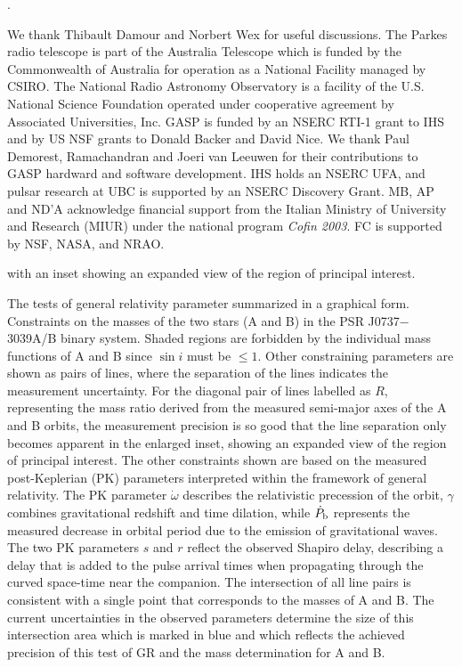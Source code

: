 \documentclass[12pt,psfig]{article}
\newcounter{lastnote}
\newenvironment{scilastnote}{%
\setcounter{lastnote}{\value{enumiv}}%
\addtocounter{lastnote}{+1}%
\begin{list}%
{\arabic{lastnote}.}
{\setlength{\leftmargin}{.22in}}
{\setlength{\labelsep}{.5em}}}
{\end{list}}
\begin{document}

\begin{scilastnote}
\item We thank Thibault Damour and Norbert Wex for useful
discussions. The Parkes radio telescope is part of the Australia
Telescope which is funded by the Commonwealth of Australia for
operation as a National Facility managed by CSIRO.  The National Radio
Astronomy Observatory is a facility of the U.S. National Science
Foundation operated under cooperative agreement by Associated
Universities, Inc.  GASP is funded by an NSERC RTI-1 grant to IHS and
by US NSF grants to Donald Backer and David Nice. 
We thank Paul Demorest, Ramachandran and Joeri van
Leeuwen for their contributions to GASP hardward and software
development. IHS holds an NSERC
UFA, and pulsar research at UBC is supported by an NSERC Discovery
Grant. MB, AP and ND'A acknowledge financial support from the Italian
Ministry of University and Research (MIUR) under the national program
{\em Cofin 2003}. FC is supported by NSF, NASA, and NRAO.
\end{scilastnote}




\clearpage
 with an inset
showing an expanded view of the region of principal interest. 

 The tests of general relativity
parameter summarized in a graphical form.  Constraints on the masses of the
two stars (A and B) in the PSR J0737$-$3039A/B binary system. Shaded regions
are forbidden by the individual mass functions of A and B since $\sin i$ must
be $\le 1$.  Other constraining parameters are shown as pairs of lines, where
the separation of the lines indicates the measurement uncertainty. For the
diagonal pair of lines labelled as $R$, representing the mass ratio derived
from the measured semi-major axes of the A and B orbits, the measurement
precision is so good that the line separation only becomes apparent in the
enlarged inset, showing an expanded view of the region of principal interest.
The other constraints shown are based on the measured post-Keplerian (PK)
parameters interpreted within the framework of general relativity. The PK
parameter $\dot\omega$ describes the relativistic precession of the orbit,
$\gamma$ combines gravitational redshift and time dilation, while
$\dot{P}_{\rm b}$ represents the measured decrease in orbital period due to
the emission of gravitational waves.  The two PK parameters $s$ and $r$
reflect the observed Shapiro delay, describing a delay that is added to the
pulse arrival times when propagating through the curved space-time near the
companion. The intersection of all line pairs is consistent with a single
point that corresponds to the masses of A and B. The current uncertainties in
the observed parameters determine the size of this intersection area which is
marked in blue and which reflects the achieved precision of this test of GR
and the mass determination for A and B.
\label{fg:m1m2}
\end{document}
